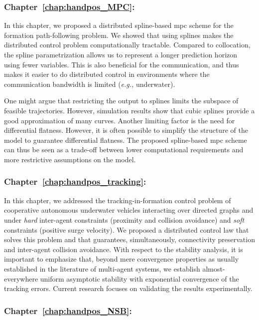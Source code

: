 \subsubsection{Chapter~\ref{chap:handpos_MPC}: }

In this chapter, we proposed a distributed spline-based \gls{mpc} scheme for the formation path-following problem.
We showed that using splines makes the distributed control problem computationally tractable.
Compared to collocation, the spline parametrization allows us to represent a longer prediction horizon using fewer variables.    
This is also beneficial for the communication, and thus makes it easier to do distributed control in environments where the communication bandwidth is limited (\emph{e.g.,} underwater).

One might argue that restricting the output to splines limits the subspace of feasible trajectories.
However, simulation results show that cubic splines provide a good approximation of many curves.
Another limiting factor is the need for differential flatness.
However, it is often possible to simplify the structure of the model to guarantee differential flatness.        
The proposed spline-based \gls{mpc} scheme can thus be seen as a trade-off between lower computational requirements and more restrictive assumptions on the model.

\subsubsection{Chapter~\ref{chap:handpos_tracking}: }

In this chapter, we addressed the tracking-in-formation control problem of cooperative autonomous underwater vehicles interacting over directed graphs and under \emph{hard} inter-agent constraints (proximity and collision avoidance) and \emph{soft} constraints (positive surge velocity). 
We proposed a distributed control law that solves this problem and that guarantees, simultaneously, connectivity preservation and inter-agent collision avoidance.
With respect to the stability analysis, it is important to emphasize that, beyond mere convergence properties as usually established in the literature of multi-agent systems, we establish almost-everywhere uniform asymptotic stability with exponential convergence of the tracking errors. 
Current research focuses on validating the results experimentally.

\subsubsection{Chapter~\ref{chap:handpos_NSB}: }


